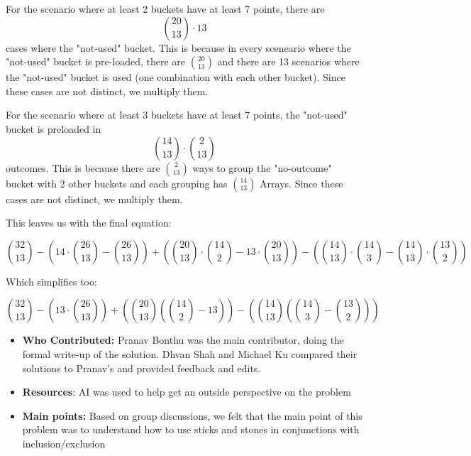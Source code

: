 \documentclass[11pt]{article}
\begin{document}
For the scenario where at least 2 buckets have at least 7 points, there are  
$$\binom{20}{13} \cdot 13$$
cases where the "not-used" bucket. This is because in every sceneario where the "not-used" bucket is pre-loaded, there are $\binom{20}{13}$ and there are 13 scenarios where the "not-used" bucket is used (one combination with each other bucket). Since these cases are not distinct, we multiply them.

For the scenario where at least 3 buckets have at least 7 points, the "not-used" bucket is preloaded in  
$$\binom{14}{13} \cdot \binom{2}{13}$$
outcomes. This is because there are $\binom{2}{13}$ ways to group the "no-outcome" bucket with 2 other buckets and each grouping has $\binom{14}{13}$ Arrays. Since these cases are not distinct, we multiply them.

This leaves us with the final equation:

$$\binom{32}{13} - (14 \cdot \binom{26}{13} - \binom{26}{13}) + (\binom{20}{13} \cdot \binom{14}{2} - 13 \cdot \binom{20}{13}) - (\binom{14}{13} \cdot \binom{14}{3} - \binom{14}{13} \cdot \binom{13}{2})$$

Which simplifies too:


$$\binom{32}{13} - (13 \cdot \binom{26}{13}) + (\binom{20}{13} (\binom{14}{2} - 13 )) - (\binom{14}{13} (\binom{14}{3} - \binom{13}{2}))$$


\begin{itemize}
    \item \textbf{Who Contributed:} Pranav Bonthu was the main contributor, doing the formal write-up of the solution. Dhvan Shah and Michael Ku compared their solutions to Pranav's and provided feedback and edits.
    \item \textbf{Resources}: AI was used to help get an outside perspective on the problem
    \item \textbf{Main points:} Based on group discussions, we felt that the main point of this problem was to understand how to use sticks and stones in conjunctions with inclusion/exclusion
\end{itemize}
\end{document}
